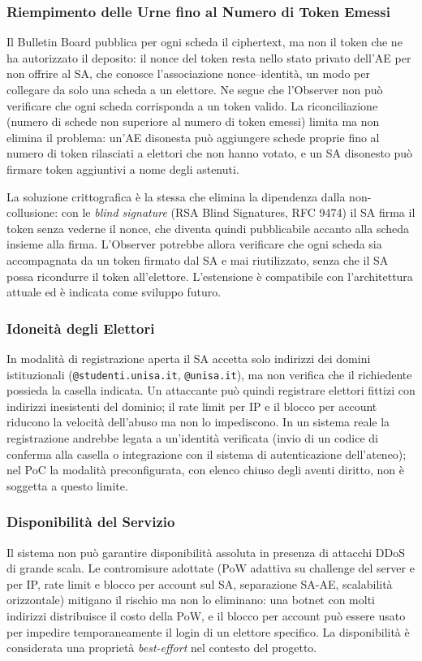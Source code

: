 \documentclass[12pt,a4paper]{article}
\begin{document}
\subsubsection{Riempimento delle Urne fino al Numero di Token Emessi}
Il Bulletin Board pubblica per ogni scheda il ciphertext, ma non il token che ne ha autorizzato il deposito: il nonce del token resta nello stato privato dell'AE per non offrire al SA, che conosce l'associazione nonce--identità, un modo per collegare da solo una scheda a un elettore. Ne segue che l'Observer non può verificare che ogni scheda corrisponda a un token valido. La riconciliazione (numero di schede non superiore al numero di token emessi) limita ma non elimina il problema: un'AE disonesta può aggiungere schede proprie fino al numero di token rilasciati a elettori che non hanno votato, e un SA disonesto può firmare token aggiuntivi a nome degli astenuti.

La soluzione crittografica è la stessa che elimina la dipendenza dalla non-collusione: con le \textit{blind signature} (RSA Blind Signatures, RFC 9474) il SA firma il token senza vederne il nonce, che diventa quindi pubblicabile accanto alla scheda insieme alla firma. L'Observer potrebbe allora verificare che ogni scheda sia accompagnata da un token firmato dal SA e mai riutilizzato, senza che il SA possa ricondurre il token all'elettore. L'estensione è compatibile con l'architettura attuale ed è indicata come sviluppo futuro.

\subsubsection{Idoneità degli Elettori}
In modalità di registrazione aperta il SA accetta solo indirizzi dei domini istituzionali (\texttt{@studenti.unisa.it}, \texttt{@unisa.it}), ma non verifica che il richiedente possieda la casella indicata. Un attaccante può quindi registrare elettori fittizi con indirizzi inesistenti del dominio; il rate limit per IP e il blocco per account riducono la velocità dell'abuso ma non lo impediscono. In un sistema reale la registrazione andrebbe legata a un'identità verificata (invio di un codice di conferma alla casella o integrazione con il sistema di autenticazione dell'ateneo); nel PoC la modalità preconfigurata, con elenco chiuso degli aventi diritto, non è soggetta a questo limite.

\subsubsection{Disponibilità del Servizio}
Il sistema non può garantire disponibilità assoluta in presenza di attacchi DDoS di grande scala. Le contromisure adottate (PoW adattiva su challenge del server e per IP, rate limit e blocco per account sul SA, separazione SA-AE, scalabilità orizzontale) mitigano il rischio ma non lo eliminano: una botnet con molti indirizzi distribuisce il costo della PoW, e il blocco per account può essere usato per impedire temporaneamente il login di un elettore specifico. La disponibilità è considerata una proprietà \textit{best-effort} nel contesto del progetto.
\end{document}
